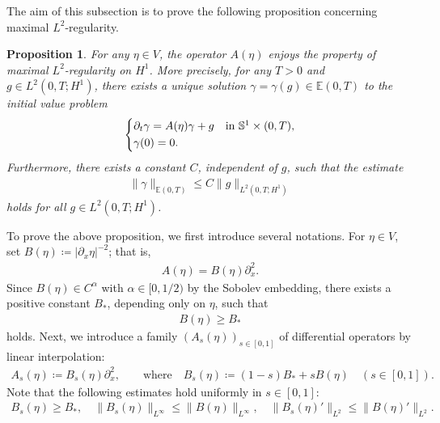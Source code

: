 \documentclass{article}
\newtheorem{proposition}[theorem]{Proposition}
\theoremstyle{remark}
\theoremstyle{definition}
\numberwithin{equation}{section}
\begin{document}
The aim of this subsection is to prove the following proposition concerning maximal $L^2$-regularity.

\begin{proposition}
    \label{prop:MR}
    For any $\eta\in V$, the operator $A(\eta)$ enjoys the property of maximal $L^2$-regularity on $H^1$.
    More precisely, for any $T>0$ and $g\in L^2(0,T;H^1)$, there exists a unique solution $\gamma = \gamma(g) \in \mathbb{E}(0,T)$ to the initial value problem
    \begin{align}
        \begin{dcases*}
            \partial_t \gamma = A(\eta)\gamma + g & in $\mathbb{S}^1\times(0,T)$,\\
            \gamma(0) = 0.
        \end{dcases*}
        \label{eq:problem_MR}
    \end{align}
    Furthermore, there exists a constant $C$, independent of $g$, such that the estimate
    \begin{align}
        \|\gamma\|_{\mathbb{E}(0,T)} \le C\|g\|_{L^2(0,T;H^1)}
        \label{eq:estimate_MR}
    \end{align}
    holds for all $g\in L^2(0,T;H^1)$.
\end{proposition}

To prove the above proposition, we first introduce several notations.
For $\eta\in V$, set $B(\eta)\coloneqq |\partial_x \eta|^{-2}$; that is,
\begin{align*}
    A(\eta) = B(\eta)\partial_x^2.
\end{align*}
Since $B(\eta)\in C^\alpha$ with $\alpha\in[0,1/2)$ by the Sobolev embedding, there exists a positive constant $B_\ast$, depending only on $\eta$, such that
\begin{align}
    B(\eta) \ge B_\ast
    \label{eq:B_ast}
\end{align}
holds. Next, we introduce a family $(A_s(\eta))_{s\in[0,1]}$ of differential operators by linear interpolation:
\begin{align*}
    A_s(\eta)\coloneqq B_s(\eta) \partial_x^2,\qquad\text{where}\quad
    B_s(\eta)\coloneqq(1-s)B_\ast+sB(\eta)\quad(s\in[0,1]).
\end{align*}
Note that the following estimates hold uniformly in $s \in [0,1]$:
\begin{align}
    B_s(\eta) \ge B_\ast,\quad
    \|B_s(\eta)\|_{L^\infty} \le \|B(\eta)\|_{L^\infty},\quad
    \|B_s(\eta)'\|_{L^2} \le \|B(\eta)'\|_{L^2}.
    \label{eq:estimate_B}
\end{align}
\end{document}
